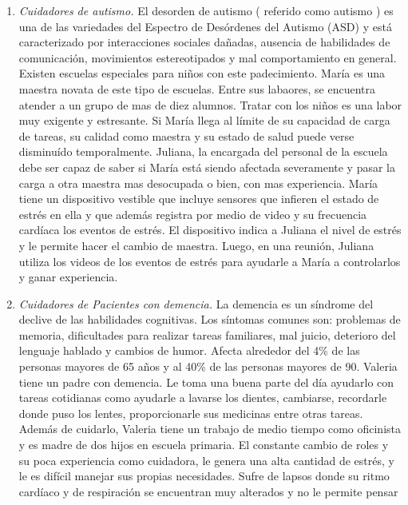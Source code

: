 \documentclass[letterpaper,12pt]{cicese}
\begin{document}
				\begin{enumerate}
					\item \emph{Cuidadores de autismo.}
					El desorden de autismo ( referido como autismo ) es una de las variedades del Espectro de Des\'ordenes del Autismo (ASD) y est\'a caracterizado por
					interacciones sociales da\~nadas, ausencia de habilidades de comunicaci\'on, movimientos estereotipados y mal comportamiento en general\citep{bernier2010autism}. Existen
					escuelas especiales para ni\~nos con este padecimiento. Mar\'ia es una maestra novata de este tipo de escuelas. Entre sus labaores, se encuentra
					atender a un grupo de mas de diez alumnos. Tratar con los ni\~nos es una labor muy exigente y estresante. Si Mar\'ia llega al l\'imite de su capacidad
					de carga de tareas, su calidad como maestra y su estado de salud puede verse disminu\'ido temporalmente. Juliana, la encargada del personal de la
					escuela debe ser capaz de saber si Mar\'ia est\'a siendo afectada severamente y pasar la carga a otra maestra mas desocupada o bien, con mas experiencia. Mar\'ia
					tiene un dispositivo vestible que incluye sensores que infieren el estado de estr\'es en ella y que adem\'as registra por medio de video y su
					frecuencia card\'iaca los eventos de estr\'es. El dispositivo indica a Juliana el nivel de estr\'es y le permite hacer el cambio de maestra. Luego,
					en una reuni\'on, Juliana utiliza los videos de los eventos de estr\'es para ayudarle a Mar\'ia a controlarlos y ganar experiencia.
					\item \emph{Cuidadores de Pacientes con demencia.}
						La demencia es un s\'indrome del declive de las habilidades cognitivas. Los s\'intomas comunes son: problemas de memoria, dificultades para
						realizar tareas familiares, mal juicio, deterioro del lenguaje hablado y cambios de humor\citep{Aziz}. Afecta alrededor del 4\% de las personas
						mayores de 65 a\~nos y al 40\% de las personas mayores de 90. Valeria tiene un padre con demencia. Le toma una buena parte del d\'ia ayudarlo
						con tareas cotidianas como ayudarle a lavarse los dientes, cambiarse, recordarle donde puso los lentes, proporcionarle sus medicinas entre
						otras tareas. Adem\'as de cuidarlo, Valeria tiene un trabajo de medio tiempo como oficinista y es madre de dos hijos en escuela primaria.
						El constante cambio de roles y su poca experiencia como cuidadora, le genera una alta cantidad de estr\'es, y le es dif\'icil manejar sus
						propias necesidades. Sufre de lapsos donde su ritmo card\'iaco y de respiraci\'on se encuentran muy alterados y no le permite pensar

\end{enumerate}
\end{document}
